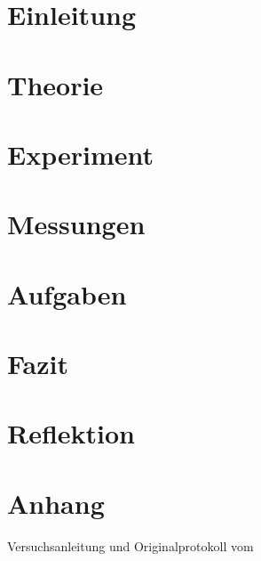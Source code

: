 \documentclass[12pt, a4paper, twoside]{article}
\begin{document}
  \maketitlepage
  
  \section{Einleitung}
  \section{Theorie}
  \section{Experiment}
  \section{Messungen}
  \section{Aufgaben}
  \section{Fazit}
  \section{Reflektion}
  \section{Anhang}
  Versuchsanleitung und Originalprotokoll vom \labdate
\end{document}
